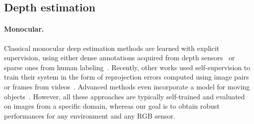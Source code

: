 \subsection{Depth estimation}

\paragraph{Monocular.} Classical monocular deep estimation methods are learned with explicit supervision, using either dense annotations acquired from depth sensors~\cite{eigen2014depth,eigen2015predicting,fu2018deep} or sparse ones from human labeling~\cite{chen2016single}. Recently, other works used self-supervision to train their system in the form of reprojection errors computed using image pairs~\cite{garg2016unsupervised,xie2016deep3d, godard2017unsupervised} or frames from videos~\cite{zhou2017unsupervised,gordon2019depth,zhao2022monovit}. Advanced methods even incorporate a model for moving objects~\cite{ranjan2018adversarial,godard2019digging,gordon2019depth,godard-iccv19-digginginto,geonet2018,chen2019self,bian2019unsupervised, li2019mannequin, tosi2020distilled, klingner2020self,li2020unsupervised}. However, all these approaches are typically self-trained and evaluated on images from a specific domain, whereas our goal is to obtain robust performances for any environment and any RGB sensor.


